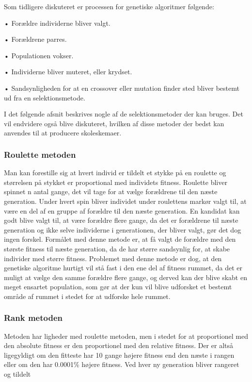 Som tidligere diskuteret er processen for genetiske algoritmer følgende:

•	Forældre individerne bliver valgt.

•	Forældrene parres.

•	Populationen vokser.

•	Individerne bliver muteret, eller krydset.

•	Sandsynligheden for at en crossover eller mutation finder sted bliver bestemt ud fra en selektionsmetode.

I det følgende afsnit beskrives nogle af de selektionsmetoder der kan bruges. Det vil endvidere også blive diskuteret, hvilken af disse metoder der bedst kan anvendes til at producere skoleskemaer.

\subsubsection{Roulette metoden}

Man kan forestille sig at hvert individ er tildelt et stykke på en roulette og størrelsen på stykket er proportional med individets fitness. Roulette bliver spinnet n antal gange, det vil tage for at vælge forældrene til den næste generation. Under hvert spin bliver individet under roulettens markør valgt til, at være en del af en gruppe af forældre til den næste generation. En kandidat kan godt blive valgt til, at være forældre flere gange, da det er forældrene til næste generation og ikke selve individerne i generationen, der bliver valgt, gør det dog ingen forskel. Formålet med denne metode er, at få valgt de forældre med den største fitness til næste generation, da de har større sandsynlig for, at skabe individer med større fitness. Problemet med denne metode er dog, at den genetiske algoritme hurtigt vil stå fast i den ene del af fitness rummet, da det er muligt at vælge den samme forældre flere gange, og derved kan der blive skabt en meget ensartet population, som gør at der kun vil blive udforsket et bestemt område af rummet i stedet for at udforske hele rummet.

\subsubsection{Rank metoden}

Metoden har ligheder med roulette metoden, men i stedet for at proportionel med den absolute fitness er den proportionel med den relative fitness. Der er altså ligegyldigt om den fitteste har 10 gange højere fitness end den næste i rangen eller om den har 0.0001\% højere fitness. Ved hver ny generation bliver rangeret og tildelt 

